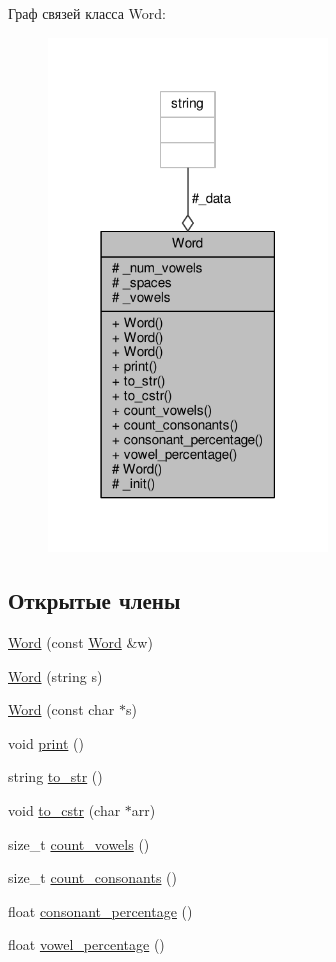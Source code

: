 Граф связей класса Word\+:\nopagebreak
\begin{figure}[H]
\begin{center}
\leavevmode
\includegraphics[width=210pt]{classWord__coll__graph}
\end{center}
\end{figure}
\subsection*{Открытые члены}
\begin{DoxyCompactItemize}
\item 
\hyperlink{classWord_ac6f487c9336bcddcdca8d149d7c3ccb5}{Word} (const \hyperlink{classWord}{Word} \&w)
\item 
\hyperlink{classWord_a86290013f4b538ae7aeef2720fc240ee}{Word} (string s)
\item 
\hyperlink{classWord_a7f27bc6191af83d7fce1a16838081872}{Word} (const char $\ast$s)
\item 
void \hyperlink{classWord_a71f14ead088ecaf6941f9c91b75c25c9}{print} ()
\item 
string \hyperlink{classWord_a75606ad31d249369f93c7ad83a6798e4}{to\+\_\+str} ()
\item 
void \hyperlink{classWord_ab02157e87243aad185d0f8f4c33862a4}{to\+\_\+cstr} (char $\ast$arr)
\item 
size\+\_\+t \hyperlink{classWord_a450a0259aba9504e3f7d6d4fa363cd7a}{count\+\_\+vowels} ()
\item 
size\+\_\+t \hyperlink{classWord_a61af6d4fa64014ce6d237657d058c57f}{count\+\_\+consonants} ()
\item 
float \hyperlink{classWord_aa19ec4d5e0b9ab9cd5f3cf54d9c4c106}{consonant\+\_\+percentage} ()
\item 
float \hyperlink{classWord_aa8e6259183ceaa15497d704c4c92b70a}{vowel\+\_\+percentage} ()
\end{DoxyCompactItemize}

